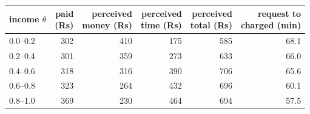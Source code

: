 \begin{tabular}{@{}lrrrrr@{}}
\toprule
income $\theta$ & \shortstack[r]{paid\\(Rs)} & \shortstack[r]{perceived\\money (Rs)} & \shortstack[r]{perceived\\time (Rs)} & \shortstack[r]{perceived\\total (Rs)} & \shortstack[r]{request to\\charged (min)} \\
\midrule
0.0--0.2 & 302 & 410 & 175 & 585 & 68.1 \\
0.2--0.4 & 301 & 359 & 273 & 633 & 66.0 \\
0.4--0.6 & 318 & 316 & 390 & 706 & 65.6 \\
0.6--0.8 & 323 & 264 & 432 & 696 & 60.1 \\
0.8--1.0 & 369 & 230 & 464 & 694 & 57.5 \\
\bottomrule
\end{tabular}
